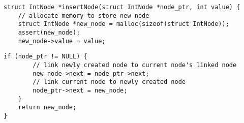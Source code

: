\documentclass[10pt]{article}
\begin{document}



\begin{lstlisting}[language=Example]
struct IntNode *insertNode(struct IntNode *node_ptr, int value) {
    // allocate memory to store new node
    struct IntNode *new_node = malloc(sizeof(struct IntNode));  
    assert(new_node);
    new_node->value = value;
\end{lstlisting}
\vspace*{-\baselineskip}
\begin{lstlisting}[language=ExampleGray]
    if (node_ptr != NULL) {
        // link newly created node to current node's linked node
        new_node->next = node_ptr->next;
        // link current node to newly created node
        node_ptr->next = new_node;
    }
    return new_node;
}
\end{lstlisting}
\end{document}
